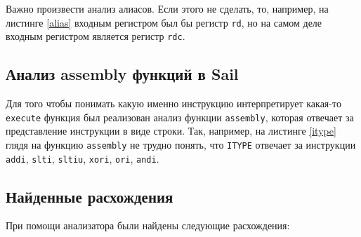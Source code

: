 Важно произвести анализ алиасов. Если этого не сделать, то, например, на листинге \ref{alias} входным регистром был бы регистр \texttt{rd}, но на самом деле входным регистром является регистр \texttt{rdc}.

\subsection{Анализ assembly функций в Sail}

Для того чтобы понимать какую именно инструкцию интерпретирует какая-то \texttt{execute} функция был реализован анализ функции \texttt{assembly}, которая отвечает за представление инструкции в виде строки. Так, например, на листинге \ref{itype} глядя на функцию \texttt{assembly} не трудно понять, что \texttt{ITYPE} отвечает за инструкции \texttt{addi}, \texttt{slti}, \texttt{sltiu}, \texttt{xori}, \texttt{ori}, \texttt{andi}.


\subsection{Найденные расхождения}

При помощи анализатора были найдены следующие расхождения:

